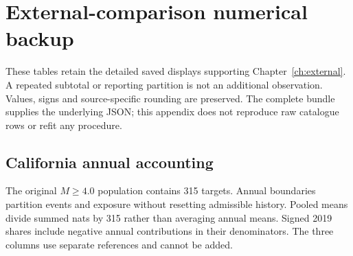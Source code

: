 \section{External-comparison numerical backup}\label{app:audit11}
These tables retain the detailed saved displays supporting Chapter~\ref{ch:external}. A repeated subtotal or reporting partition is not an additional observation. Values, signs and source-specific rounding are preserved. The complete bundle supplies the underlying JSON; this appendix does not reproduce raw catalogue rows or refit any procedure.

\subsection{California annual accounting}\label{app:audit11-annual}
The original $M\geq 4.0$ population contains 315 targets. Annual boundaries partition events and exposure without resetting admissible history. Pooled means divide summed nats by 315 rather than averaging annual means. Signed 2019 shares include negative annual contributions in their denominators. The three columns use separate references and cannot be added.

